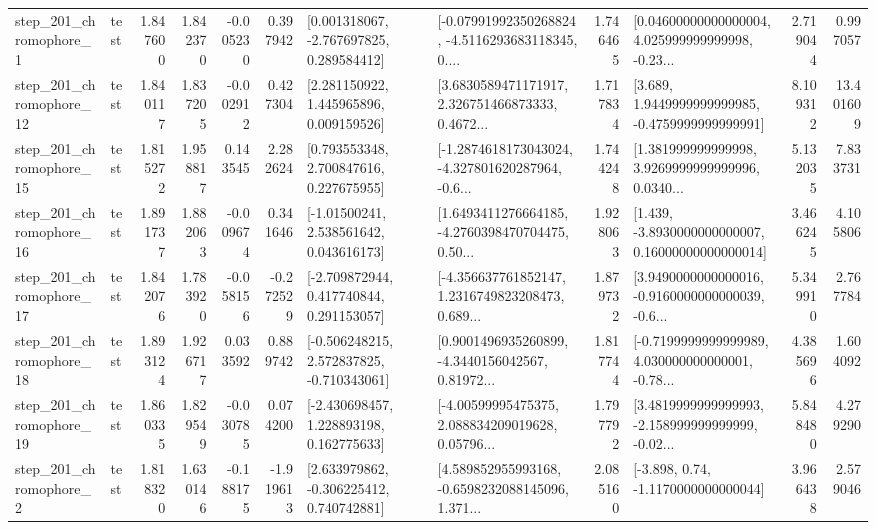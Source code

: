 \begin{tabular}{llrrrrllrlrr}
   step\_201\_chromophore\_1 &      test &      1.847600 &    1.842370 &     -0.005230 &  0.397942 &    [0.001318067, -2.767697825, 0.289584412] &  [-0.07991992350268824, -4.5116293683118345, 0.... &       1.746465 &  [0.04600000000000004, 4.025999999999998, -0.23... &            2.719044 &          0.997057 \\
  step\_201\_chromophore\_12 &      test &      1.840117 &    1.837205 &     -0.002912 &  0.427304 &     [2.281150922, 1.445965896, 0.009159526] &  [3.6830589471171917, 2.326751466873333, 0.4672... &       1.717834 &   [3.689, 1.9449999999999985, -0.4759999999999991] &            8.109312 &         13.401609 \\
  step\_201\_chromophore\_15 &      test &      1.815272 &    1.958817 &      0.143545 &  2.282624 &     [0.793553348, 2.700847616, 0.227675955] &  [-1.2874618173043024, -4.327801620287964, -0.6... &       1.744248 &  [1.381999999999998, 3.9269999999999996, 0.0340... &            5.132035 &          7.833731 \\
  step\_201\_chromophore\_16 &      test &      1.891737 &    1.882063 &     -0.009674 &  0.341646 &     [-1.01500241, 2.538561642, 0.043616173] &  [1.6493411276664185, -4.2760398470704475, 0.50... &       1.928063 &  [1.439, -3.8930000000000007, 0.16000000000000014] &            3.466245 &          4.105806 \\
  step\_201\_chromophore\_17 &      test &      1.842076 &    1.783920 &     -0.058156 & -0.272529 &    [-2.709872944, 0.417740844, 0.291153057] &  [-4.356637761852147, 1.2316749823208473, 0.689... &       1.879732 &  [3.9490000000000016, -0.9160000000000039, -0.6... &            5.349910 &          2.767784 \\
  step\_201\_chromophore\_18 &      test &      1.893124 &    1.926717 &      0.033592 &  0.889742 &   [-0.506248215, 2.572837825, -0.710343061] &  [0.9001496935260899, -4.3440156042567, 0.81972... &       1.817744 &  [-0.7199999999999989, 4.030000000000001, -0.78... &            4.385696 &          1.604092 \\
  step\_201\_chromophore\_19 &      test &      1.860335 &    1.829549 &     -0.030785 &  0.074200 &    [-2.430698457, 1.228893198, 0.162775633] &  [-4.00599995475375, 2.088834209019628, 0.05796... &       1.797792 &  [3.4819999999999993, -2.158999999999999, -0.02... &            5.848480 &          4.279290 \\
   step\_201\_chromophore\_2 &      test &      1.818320 &    1.630146 &     -0.188175 & -1.919613 &    [2.633979862, -0.306225412, 0.740742881] &  [4.589852955993168, -0.6598232088145096, 1.371... &       2.085160 &                [-3.898, 0.74, -1.1170000000000044] &            3.966438 &          2.579046 \\

\end{tabular}
